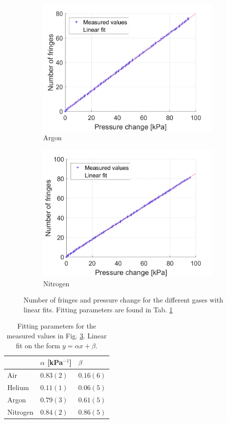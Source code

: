\begin{figure}[H]
\begin{subfigure}{0.49\textwidth}
    \includegraphics[width=\textwidth]{matlab/Argon}
    \caption{Argon}
    \label{fig:Argon}
  \end{subfigure}
  \begin{subfigure}{0.49\textwidth}
    \includegraphics[width=\textwidth]{matlab/Nitrogen}
    \caption{Nitrogen}
    \label{fig:Nitrogen}
  \end{subfigure}
  \caption{Number of fringes and pressure change for the different gases with linear fits. Fitting parameters are found in Tab. \ref{tab:linearFits}}
  \label{fig:measurements}
\end{figure}

\begin{table}[H]
  \centering
  \caption{Fitting parameters for the measured values in Fig. \ref{fig:measurements}. Linear fit on the form $y=\alpha x + \beta$.}
  \label{tab:linearFits}
  \begin{tabular}{l|l|l}
           & $\alpha$ [kPa$^{-1}$]& $\beta$ \\ \hline
  Air      & $0.83(2)$  & $0.16(6)$ \\
  Helium   & $0.11(1)$ & $0.06(5)$ \\
  Argon    & $0.79(3)$ & $0.61(5)$ \\
  Nitrogen & $0.84(2)$ & $0.86(5)$
  \end{tabular}
\end{table}

